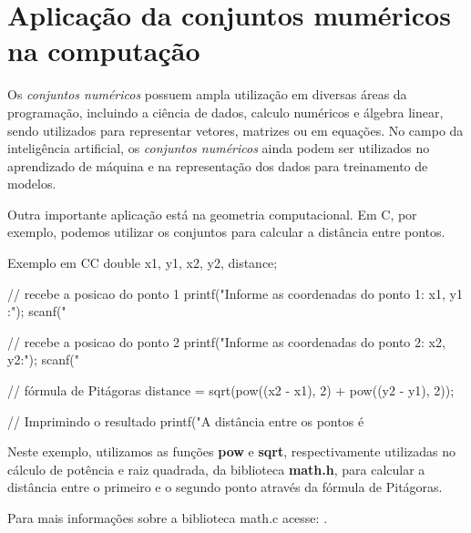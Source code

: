 \section{Aplicação da conjuntos muméricos na computação}

Os \emph{conjuntos numéricos} possuem ampla utilização em diversas áreas da programação, incluindo a ciência de dados, calculo numéricos e álgebra linear, sendo utilizados para representar vetores, matrizes ou em equações. No campo da inteligência artificial, os \emph{conjuntos numéricos} ainda podem ser utilizados no aprendizado de máquina e na representação dos dados para treinamento de modelos.

Outra importante aplicação está na geometria computacional. Em C, por exemplo, podemos utilizar os conjuntos para calcular a distância entre pontos. \\

\begin{codesnip}{Exemplo em C}{C}
double x1, y1, x2, y2, distance;

// recebe a posicao do ponto 1
printf("Informe as coordenadas do ponto 1: x1, y1 :\n");
scanf("%

// recebe a posicao do ponto 2
printf("Informe as coordenadas do ponto 2: x2, y2:\n");
scanf("%

// fórmula de Pitágoras
distance = sqrt(pow((x2 - x1), 2) + pow((y2 - y1), 2));

// Imprimindo o resultado
printf("A distância entre os pontos é %
\end{codesnip}

Neste exemplo, utilizamos as funções \textbf{pow} e \textbf{sqrt}, respectivamente utilizadas no cálculo de potência e raiz quadrada, da biblioteca \textbf{math.h}, para calcular a distância entre o primeiro e o segundo ponto através da fórmula de Pitágoras.

Para mais informações sobre a biblioteca math.c acesse: . \\




